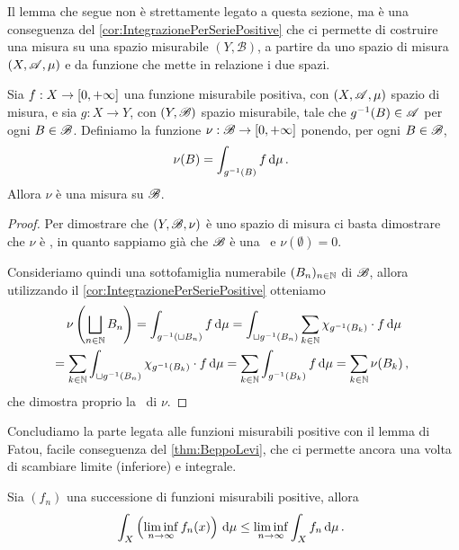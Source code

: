 Il lemma che segue non è strettamente legato a questa sezione, ma è una conseguenza del \cref{cor:IntegrazionePerSeriePositive} che ci permette di costruire una misura su una spazio misurabile $(Y,\mathscr B)$, a partire da uno spazio di misura $(X,\mathscr A,\mu)$ e da funzione che mette in relazione i due spazi.

\begin{lemma}\label{lemma:MisuraIntegrale}
	Sia $f:X\to[0,+\infty]$ una funzione misurabile positiva, con $(X,\mathscr A,\mu)$ spazio di misura, e sia $g:X\to Y$, con $(Y,\mathscr B)$ spazio misurabile, tale che $g^{-1}(B)\in\mathscr A$ per ogni $B\in\mathscr B$. Definiamo la funzione $\nu:\mathscr B\to[0,+\infty]$ ponendo, per ogni $B\in\mathscr B$,
	\begin{equation*}
		\nu(B)=\int_{g^{-1}(B)}f\,\mathrm d\mu\, \text{. }
	\end{equation*}
	Allora $\nu$ è una misura su $\mathscr B$.
\end{lemma}
\begin{proof}
	Per dimostrare che $(Y,\mathscr B,\nu)$ è uno spazio di misura ci basta dimostrare che $\nu$ è \sigadd, in quanto sappiamo già che $\mathscr B$ è una \sigalg\ e $\nu(\emptyset)=0$.
	
	Consideriamo quindi una sottofamiglia numerabile $(B_n)_{n\in\mathbb N}$ di $\mathscr B$, allora utilizzando il \cref{cor:IntegrazionePerSeriePositive} otteniamo
	\begin{multline*}
		\nu\left(\bigsqcup_{n\in\mathbb N}B_n\right)=\int_{g^{-1}(\sqcup B_n)}f\,\mathrm d\mu=\int_{\sqcup g^{-1}(B_n)}\sum_{k\in\mathbb N}\chi_{g^{-1}(B_k)}\cdot f\,\mathrm d\mu\\
		=\sum_{k\in\mathbb N}\int_{\sqcup g^{-1}(B_n)}\chi_{g^{-1}(B_k)}\cdot f\,\mathrm d\mu=
		\sum_{k\in\mathbb N}\int_{g^{-1}(B_k)}f\,\mathrm d\mu=\sum_{k\in\mathbb N}\nu(B_k)\, \text{, }
	\end{multline*}
	che dimostra proprio la \sigadd\ di $\nu$.
\end{proof}

Concludiamo la parte legata alle funzioni misurabili positive con il lemma di Fatou, facile conseguenza del \cref{thm:BeppoLevi}, che ci permette ancora una volta di scambiare limite (inferiore) e integrale.

\begin{lemma} \label{lemma:Fatou}
	Sia $(f_n)$ una successione di funzioni misurabili positive, allora 
	\begin{equation*}
		\int_X\left(\liminf_{n\to\infty}f_n(x)\right)\,\mathrm d\mu\le \liminf_{n\to\infty}\int_Xf_n\,\mathrm d\mu\, \text{. }
	\end{equation*}
\end{lemma}

